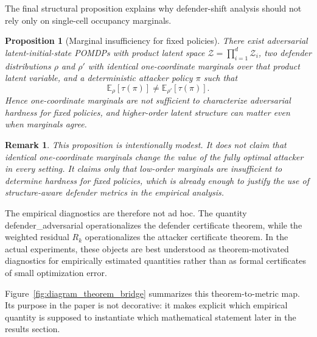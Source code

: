 \documentclass[11pt]{article}
\newtheorem{proposition}{Proposition}
\newtheorem{remark}{Remark}
\newcommand{\Zset}{\mathcal{Z}}
\newcommand{\E}{\mathbb{E}}
\newcommand{\tauT}{\tau}
\begin{document}
The final structural proposition explains why defender-shift analysis should not rely only on single-cell occupancy marginals.

\begin{proposition}[Marginal insufficiency for fixed policies]
There exist adversarial latent-initial-state POMDPs with product latent space $\Zset=\prod_{i=1}^{d}\Zset_i$, two defender distributions $\rho$ and $\rho'$ with identical one-coordinate marginals over that product latent variable, and a deterministic attacker policy $\pi$ such that
\[
\E_{\rho}[\tauT(\pi)] \neq \E_{\rho'}[\tauT(\pi)].
\]
Hence one-coordinate marginals are not sufficient to characterize adversarial hardness for fixed policies, and higher-order latent structure can matter even when marginals agree.
\end{proposition}

\begin{remark}
This proposition is intentionally modest. It does not claim that identical one-coordinate marginals change the value of the \emph{fully optimal} attacker in every setting. It claims only that low-order marginals are insufficient to determine hardness for fixed policies, which is already enough to justify the use of structure-aware defender metrics in the empirical analysis.
\end{remark}

The empirical diagnostics are therefore not ad hoc. The quantity \textsf{defender\_adversarial} operationalizes the defender certificate theorem, while the weighted residual $R_k$ operationalizes the attacker certificate theorem. In the actual experiments, these objects are best understood as theorem-motivated diagnostics for empirically estimated quantities rather than as formal certificates of small optimization error.

Figure~\ref{fig:diagram_theorem_bridge} summarizes this theorem-to-metric map. Its purpose in the paper is not decorative: it makes explicit which empirical quantity is supposed to instantiate which mathematical statement later in the results section.
\end{document}
